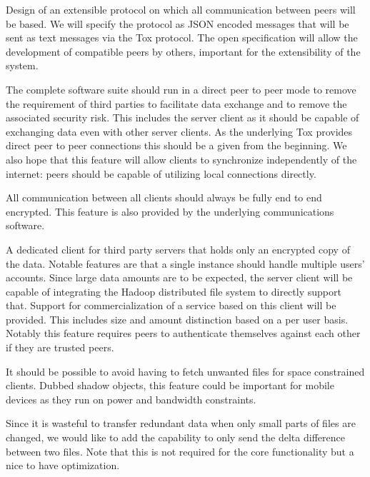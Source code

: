 \begin{description}[leftmargin=2em,style=nextline,noitemsep,nolistsep]
\item[Protocol]
    Design of an extensible protocol on which all communication between peers will be based.
    We will specify the protocol as JSON encoded messages that will be sent as text messages via the Tox protocol.
    The open specification will allow the development of compatible peers by others, important for the extensibility of the system.
\item[Peer to Peer Architecture]
    The complete software suite should run in a direct peer to peer mode to remove the requirement of third parties to facilitate data exchange and to remove the associated security risk.
    This includes the server client as it should be capable of exchanging data even with other server clients.
    As the underlying Tox provides direct peer to peer connections this should be a given from the beginning.
    We also hope that this feature will allow clients to synchronize independently of the internet: peers should be capable of utilizing local connections directly.
\item[Secure Transport]
    All communication between all clients should always be fully end to end encrypted.
    This feature is also provided by the underlying communications software.
\item[Third Party Client]
    A dedicated client for third party servers that holds only an encrypted copy of the data.
    Notable features are that a single instance should handle multiple users' accounts.
    Since large data amounts are to be expected, the server client will be capable of integrating the Hadoop distributed file system to directly support that.
    Support for commercialization of a service based on this client will be provided.
    This includes size and amount distinction based on a per user basis.
    Notably this feature requires peers to authenticate themselves against each other if they are trusted peers.
\item[Shadow Files]
    It should be possible to avoid having to fetch unwanted files for space constrained clients.
    Dubbed shadow objects, this feature could be important for mobile devices as they run on power and bandwidth constraints.
\item[Delta Updates]
    Since it is wasteful to transfer redundant data when only small parts of files are changed, we would like to add the capability to only send the delta difference between two files.
    Note that this is not required for the core functionality but a nice to have optimization.

\end{description}
